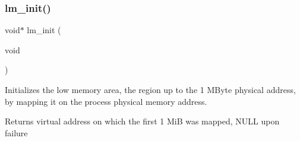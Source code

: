 \subsubsection{\texorpdfstring{lm\+\_\+init()}{lm\_init()}}
{\footnotesize\ttfamily void$\ast$ lm\+\_\+init (\begin{DoxyParamCaption}\item[{void}]{ }\end{DoxyParamCaption})}



Initializes the low memory area, the region up to the 1 M\+Byte physical address, by mapping it on the process\textquotesingle{} physical memory address. 

\begin{DoxyReturn}{Returns}
virtual address on which the first 1 MiB was mapped, N\+U\+LL upon failure 
\end{DoxyReturn}
